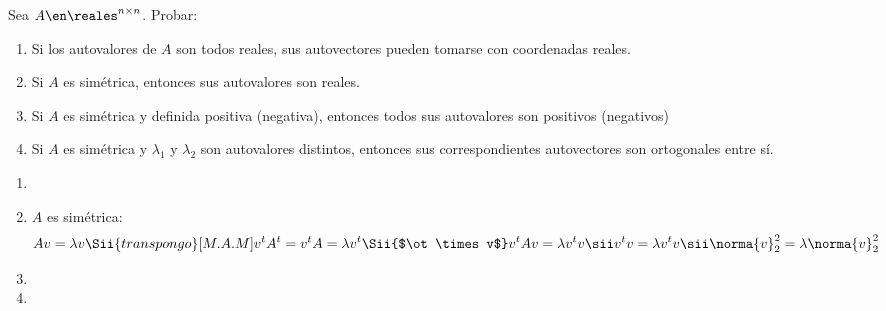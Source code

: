 \begin{enunciado}{\ejercicio}
  Sea $A \en \reales^{n \times n}$. Probar:
  \begin{enumerate}[label=(\alph*)]
    \item Si los autovalores de $A$ son todos reales, sus autovectores pueden tomarse con coordenadas reales.

    \item Si $A$ es simétrica, entonces sus autovalores son reales.

    \item Si $A$ es simétrica y definida positiva (negativa), entonces todos sus autovalores son positivos (negativos)

    \item Si $A$ es simétrica y $\lambda_1$ y $\lambda_2$ son autovalores distintos, entonces sus correspondientes autovectores
          son ortogonales entre sí.
  \end{enumerate}
\end{enunciado}

\begin{enumerate}[label=(\alph*)]
  \item \hacer

  \item $A$ es simétrica:
        $$
          A v = \lambda v
          \Sii{transpongo}[M.A.M]
          v^t A^t = v^t A = \lambda v^t
          \Sii{$\ot \times v$}
          v^t A v = \lambda v^t v
          \sii
          v^t v = \lambda v^t v
          \sii
          \norma{v}_2^2 = \lambda \norma{v}_2^2
        $$

  \item \hacer

  \item \hacer
\end{enumerate}

